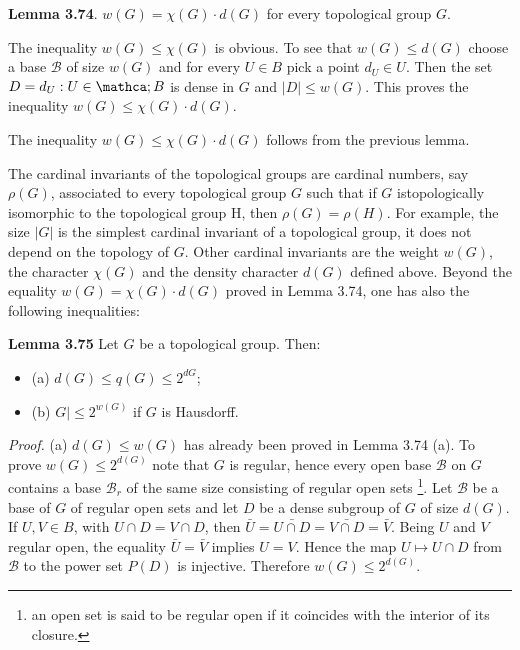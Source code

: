 \documentclass[12pt]{article}
\begin{document}
\textbf{Lemma 3.74}. $w(G) = \chi(G) · d(G)$ for every topological group $G$.


 The inequality $w(G) \leq \chi(G)$ is obvious. To see that $w(G) \leq d(G)$ choose a base $\mathcal{B}$ of size $w(G)$ and for
every $U \in B$ pick a point $d_U \in U$. Then the set $D = {d_U : U \in \mathca;{B}}$ is dense in $G$ and $|D| \leq w(G)$. This proves
the inequality $w(G) \leq \chi(G) · d(G)$.


    The inequality $w(G) \leq \chi(G) · d(G)$ follows from the previous lemma.


    The cardinal invariants of the topological groups are cardinal numbers, say $\rho(G)$, associated to every
topological group $G$ such that if $G$ istopologically isomorphic to the topological group H, then $\rho(G) = \rho(H)$. For
example, the size $|G|$ is the simplest cardinal invariant of a topological group, it does not depend on the topology
of $G$. Other cardinal invariants are the weight $w(G)$, the character $\chi(G)$ and the density character $d(G)$ defined
above. Beyond the equality $w(G) = \chi(G) · d(G)$ proved in Lemma 3.74, one has also the following inequalities:


\textbf{Lemma 3.75} Let $G$ be a topological group. Then:

\begin{itemize}

    \item (a) $d(G) \leq q(G) \leq 2^{d{G}}$;
    
    \item (b) $G| \leq 2^{w(G)}$ if $G$ is  Hausdorff.

\end{itemize}


\emph{Proof.} (a) $d(G) ≤ w(G)$ has already been proved in Lemma 3.74 (a). To prove $w(G) \leq 2^{d(G)}$ note that $G$ is
regular, hence every open base $\mathcal{B}$ on $G$ contains a base $\mathcal{B}_r$ of the same size consisting of regular open sets \footnote[9]{an open set is said to be regular open if it coincides with the interior of its closure.}.
Let $\mathcal{B}$ be a base of $G$ of regular open sets and let $D$ be a dense subgroup of $G$ of size $d(G)$. If $U, V \in B$, with
$U \cap D = V \cap D$, then $\bar{U} = \bar{U \cap D} = \bar{V \cap D} = \bar{V}$. Being $U$ and $V$ regular open, the equality $\bar{U} = \bar{V}$ implies
$U = V$. Hence the map $U \mapsto U \cap D$ from $\mathcal{B}$ to the power set $P(D)$ is injective. Therefore $w(G) \leq 2^{d(G)}$.
\end{document}
